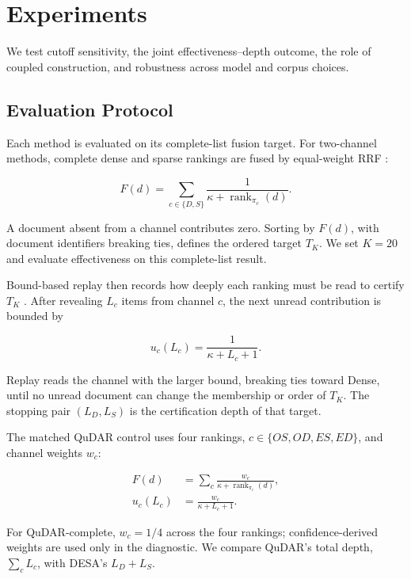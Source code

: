 \section{Experiments}

\label{sec:experiments}

We test cutoff sensitivity, the joint effectiveness--depth outcome, the role of coupled construction, and robustness across model and corpus choices.

\subsection{Evaluation Protocol}

\label{sec:quality-access}

Each method is evaluated on its complete-list fusion target. For two-channel methods, complete dense and sparse rankings are fused by equal-weight RRF \citep{cormack-etal-2009-rrf}:

\[F(d)=
\sum_{c\in\{D,S\}}
\frac{1}{\kappa+\operatorname{rank}_{\pi_c}(d)}.\]

A document absent from a channel contributes zero. Sorting by \(F(d)\), with document identifiers breaking ties, defines the ordered target \(T_K\). We set \(K=20\) and evaluate effectiveness on this complete-list result.

Bound-based replay then records how deeply each ranking must be read to certify \(T_K\) \citep{zhang2026exact}. After revealing \(L_c\) items from channel \(c\), the next unread contribution is bounded by

\[u_c(L_c)=\frac{1}{\kappa+L_c+1}.\]

Replay reads the channel with the larger bound, breaking ties toward Dense, until no unread document can change the membership or order of \(T_K\). The stopping pair \((L_D,L_S)\) is the certification depth of that target.

The matched QuDAR control uses four rankings, \(c\in\{OS,OD,ES,ED\}\), and channel weights \(w_c\):

\[\begin{aligned}
F(d) &= \sum_c \frac{w_c}
{\kappa+\operatorname{rank}_{\pi_c}(d)}, \\
u_c(L_c) &= \frac{w_c}{\kappa+L_c+1}.
\end{aligned}\]

For QuDAR-complete, \(w_c=1/4\) across the four rankings; confidence-derived weights are used only in the diagnostic. We compare QuDAR's total depth, \(\sum_c L_c\), with DESA's \(L_D+L_S\).

